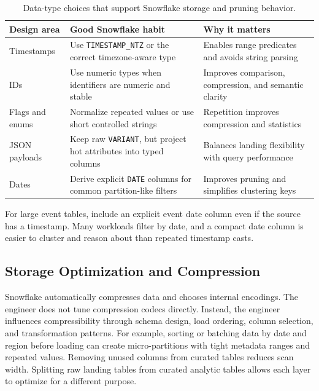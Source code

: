 \begin{table}[H]
\centering
\small
\begin{tabular}{@{}p{3.2cm}p{5.2cm}p{5.2cm}@{}}
\toprule
\textbf{Design area} & \textbf{Good Snowflake habit} & \textbf{Why it matters} \\
\midrule
Timestamps & Use \texttt{TIMESTAMP\_NTZ} or the correct timezone-aware type & Enables range predicates and avoids string parsing \\
IDs & Use numeric types when identifiers are numeric and stable & Improves comparison, compression, and semantic clarity \\
Flags and enums & Normalize repeated values or use short controlled strings & Repetition improves compression and statistics \\
JSON payloads & Keep raw \texttt{VARIANT}, but project hot attributes into typed columns & Balances landing flexibility with query performance \\
Dates & Derive explicit \texttt{DATE} columns for common partition-like filters & Improves pruning and simplifies clustering keys \\
\bottomrule
\end{tabular}
\caption{Data-type choices that support Snowflake storage and pruning behavior.}
\label{tab:chapter1-data-types}
\end{table}

\begin{tipbox}
For large event tables, include an explicit event date column even if the source has a timestamp. Many workloads filter by date, and a compact date column is easier to cluster and reason about than repeated timestamp casts.
\end{tipbox}

\subsection{Storage Optimization and Compression}
Snowflake automatically compresses data and chooses internal encodings. The engineer does not tune compression codecs directly. Instead, the engineer influences compressibility through schema design, load ordering, column selection, and transformation patterns. For example, sorting or batching data by date and region before loading can create micro-partitions with tight metadata ranges and repeated values. Removing unused columns from curated tables reduces scan width. Splitting raw landing tables from curated analytic tables allows each layer to optimize for a different purpose.

